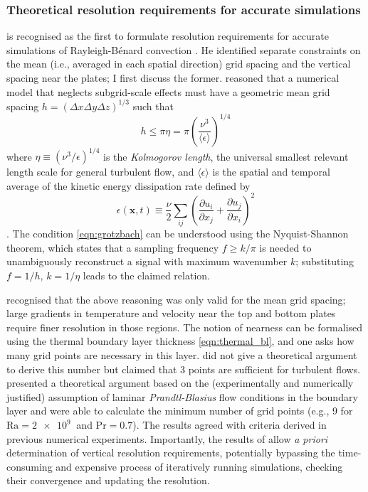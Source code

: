 \documentclass[titlepage]{article}
\numberwithin{equation}{section}
\newcommand{\pdiff}[2]{\frac{\partial #1}{\partial #2}}
\renewcommand\vec{\bm}
\newcommand{\prandtl}{\ensuremath{\mathrm{Pr}}}
\newcommand{\rayleigh}{\ensuremath{\mathrm{Ra}}}
\newcommand{\rb}{Rayleigh-B\'{e}nard}
\begin{document}
\subsubsection{Theoretical resolution requirements for accurate simulations}%
\label{sec:res_requirements}

\textcite{grotzbach1983} is recognised as the first to formulate resolution
requirements for accurate simulations of \rb{} convection
\parencite{chilla2012,scheel2013}. He identified separate constraints on the
mean (i.e., averaged in each spatial direction) grid spacing and the vertical
spacing near the plates; I first discuss the former.
\citeauthor{grotzbach1983} reasoned that a numerical model that neglects
subgrid-scale effects must have a geometric mean grid spacing $h = (\Delta x
\Delta y \Delta z)^{1/3}$ such that
\begin{equation}
    \label{eqn:grotzbach}
    h \leq \pi \eta = \pi \left(
        \frac{\nu^3}{\langle \epsilon \rangle}
    \right)^{1/4}
\end{equation}
where $\eta \equiv (\nu^3/\epsilon)^{1/4}$ is the \emph{Kolmogorov length}, the
universal smallest relevant length scale for general turbulent flow, and
$\langle \epsilon \rangle$ is the spatial and temporal average of the kinetic
energy dissipation rate defined by
\begin{equation}
    \label{eqn:kinetic_dissipation}
    \epsilon(\vec{x}, t) \equiv \frac{\nu}{2} \sum_{ij} \left(
        \pdiff{u_i}{x_j} + \pdiff{u_j}{x_i}
    \right)^2
\end{equation}
\parencite{chilla2012}. The condition \cref{eqn:grotzbach} can be
understood using the Nyquist-Shannon theorem, which states that a
sampling frequency $f \geq k/\pi$ is needed to unambiguously reconstruct
a signal with maximum wavenumber $k$; substituting $f = 1/h$, $k =
1/\eta$ leads to the claimed relation.

\citeauthor{grotzbach1983} recognised that the above reasoning was only valid
for the mean grid spacing; large gradients in temperature and velocity near the
top and bottom plates require finer resolution in those regions. The notion of
nearness can be formalised using the thermal boundary layer thickness
\cref{eqn:thermal_bl}, and one asks how many grid points are necessary in this
layer. \citeauthor{grotzbach1983} did not give a theoretical argument to derive
this number but claimed that 3 points are sufficient for turbulent flows.
\textcite{shishkina2010} presented a theoretical argument based on the
(experimentally and numerically justified) assumption of laminar
\emph{Prandtl-Blasius} flow conditions in the boundary layer and were able to
calculate the minimum number of grid points (e.g., 9 for $\rayleigh =
\SI{2e9}{}$ and $\prandtl = 0.7$). The results agreed with criteria derived in
previous numerical experiments. Importantly, the results of
\citeauthor{shishkina2010} allow \emph{a priori} determination of vertical
resolution requirements, potentially bypassing the time-consuming and expensive
process of iteratively running simulations, checking their convergence and
updating the resolution.
\end{document}
